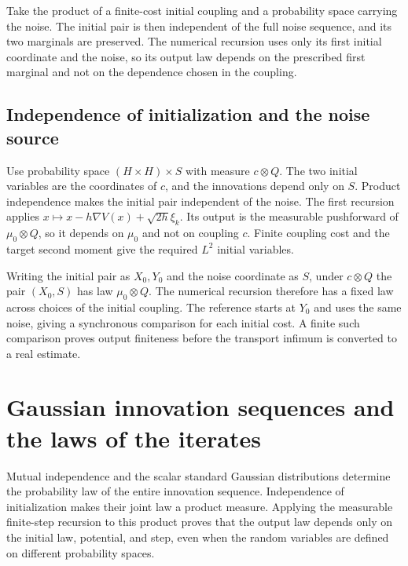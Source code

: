 \documentclass[11pt,a4paper]{article}
\begin{document}
Take the product of a finite-cost initial coupling and a probability space carrying the noise. The initial pair is then independent of the full noise sequence, and its two marginals are preserved. The numerical recursion uses only its first initial coordinate and the noise, so its output law depends on the prescribed first marginal and not on the dependence chosen in the coupling.



\subsection{\texorpdfstring{Independence of initialization and the noise source}{Independence of initialization and the noise source}}


Use probability space \((H\times H)\times S\) with measure \(c\otimes Q\). The two initial variables are the coordinates of \(c\), and the innovations depend only on \(S\). Product independence makes the initial pair independent of the noise. The first recursion applies \(x\mapsto x-h\nabla V(x)+\sqrt{2h}\xi_k\). Its output is the measurable pushforward of \(\mu_0\otimes Q\), so it depends on \(\mu_0\) and not on coupling \(c\). Finite coupling cost and the target second moment give the required \(L^2\) initial variables.



Writing the initial pair as \(X_0,Y_0\) and the noise coordinate as \(S\), under \(c\otimes Q\) the pair \((X_0,S)\) has law \(\mu_0\otimes Q\). The numerical recursion therefore has a fixed law across choices of the initial coupling. The reference starts at \(Y_0\) and uses the same noise, giving a synchronous comparison for each initial cost. A finite such comparison proves output finiteness before the transport infimum is converted to a real estimate.



\section{\texorpdfstring{Gaussian innovation sequences and the laws of the iterates}{Gaussian innovation sequences and the laws of the iterates}}


Mutual independence and the scalar standard Gaussian distributions determine the probability law of the entire innovation sequence. Independence of initialization makes their joint law a product measure. Applying the measurable finite-step recursion to this product proves that the output law depends only on the initial law, potential, and step, even when the random variables are defined on different probability spaces.
\end{document}
